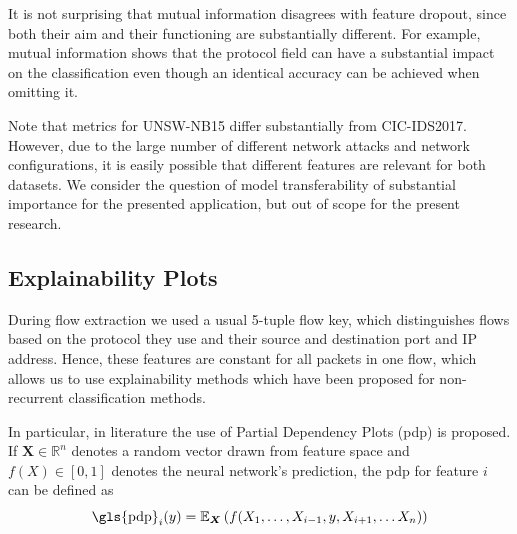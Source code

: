 \documentclass[conference]{IEEEtran}
\begin{document}
It is not surprising that mutual information disagrees with feature dropout, since both their aim and their functioning are substantially different. For example, mutual information shows that the protocol field can have a substantial impact on the classification even though an identical accuracy can be achieved when omitting it.


Note that metrics for UNSW-NB15 differ substantially from CIC-IDS2017. However, due to the large number of different network attacks and network configurations, it is easily possible that different features are relevant for both datasets. We consider the question of model transferability of substantial importance for the presented application, but out of scope for the present research.

\subsection{Explainability Plots}
During flow extraction we used a usual 5-tuple flow key, which distinguishes flows based on the protocol they use and their source and destination port and IP address. Hence, these features are constant for all packets in one flow, which allows us to use explainability methods which have been proposed for non-recurrent classification methods.

In particular,  in literature the use of Partial Dependency Plots (\gls{pdp}) is proposed. If $\boldsymbol X \in \mathbb R ^n$ denotes a random vector drawn from feature space and $f(X) \in [0,1]$ denotes the neural network's prediction, the \gls{pdp} for feature $i$ can be defined as
\begin{equation} \label{eq:pdp}
\text{\gls{pdp}}_i(y) = \mathbb E_{\boldsymbol X}\left(f(X_1,\ldots,X_{i-1},y,X_{i+1},\ldots X_n)\right)
\end{equation}
\end{document}
